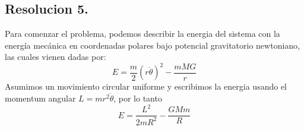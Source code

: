 \documentclass[
  11pt,
  letterpaper,
   addpoints,
  ]{exam}
\begin{document}
\begin{questions}
\begin{solution}
\subsection*{Resolucion 5.}
Para comenzar el problema, podemos describir la energia del sistema con la energía mecánica en coordenadas polares bajo potencial gravitatorio newtoniano, las cuales vienen dadas por:
\begin{equation}
E= \frac{m}{2}\left(r\dot{\theta}\right)^{2} - \frac{mMG}{r}
\end{equation}
Asumimos un movimiento circular uniforme y escribimos la energia usando el momentum angular $L=m r^{2}\dot\theta$, por lo tanto
\begin{equation}
E = \frac{L^{2}}{2mR^{2}} - \frac{GMm}{R}
\end{equation}


\end{solution}
\end{questions}
\end{document}
